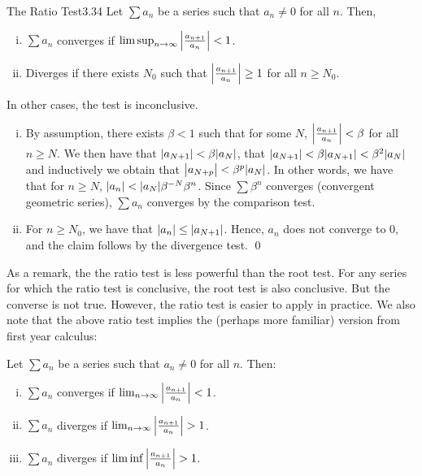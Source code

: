 \begin{theorem}{The Ratio Test}{3.34}
    Let $\sum a_n$ be a series such that $a_n \neq 0$ for all $n$. Then,
    \begin{enumerate}[(i)]
        \item $\sum a_n$ converges if $\limsup_{n \rightarrow \infty} \abs{\frac{a_{n+1}}{a_n}} < 1$. 
        \item Diverges if there exists $N_0$ such that $\abs{\frac{a_{n+1}}{a_n}} \geq 1$ for all $n \geq N_0$. 
    \end{enumerate}
\end{theorem}
\noindent In other cases, the test is inconclusive.
\begin{nproof}
    \begin{enumerate}[(i)]
        \item By assumption, there exists $\beta < 1$ such that for some $N$, $\abs{\frac{a_{n+1}}{a_n}} < \beta$ for all $n \geq N$. We then have that $\abs{a_{N+1}} < \beta \abs{a_N}$, that $\abs{a_{N+1}} < \beta \abs{a_{N+1}} < \beta^2 \abs{a_N}$ and inductively we obtain that $\abs{a_{N+p}} < \beta^p \abs{a_N}$. In other words, we have that for $n \geq N$, $\abs{a_n} < \abs{a_N}\beta^{-N}\beta^{n}$. Since $\sum \beta^n$ converges (convergent geometric series), $\sum a_n$ converges by the comparison test.
        \item For $n \geq N_0$, we have that $\abs{a_n} \leq \abs{a_{N+1}}$. Hence, $a_n$ does not converge to 0, and the claim follows by the divergence test. \qed
    \end{enumerate}
\end{nproof}
\noindent As a remark, the the ratio test is less powerful than the root test. For any series for which the ratio test is conclusive, the root test is also conclusive. But the converse is not true. However, the ratio test is easier to apply in practice. We also note that the above ratio test implies the (perhaps more familiar) version from first year calculus:
\begin{ncorollary}{}{}
    Let $\sum a_n$ be a series such that $a_n \neq 0$ for all $n$. Then:
    \begin{enumerate}[(i)]
        \item $\sum a_n$ converges if $\lim_{n \rightarrow \infty} \abs{\frac{a_{n+1}}{a_n}} < 1$.
        \item $\sum a_n$ diverges if $\lim_{n \rightarrow \infty} \abs{\frac{a_{n+1}}{a_n}} > 1$.
        \item $\sum a_n$ diverges if $\liminf \abs{\frac{a_{n+1}}{a_n}} > 1$.
    \end{enumerate}
\end{ncorollary}

